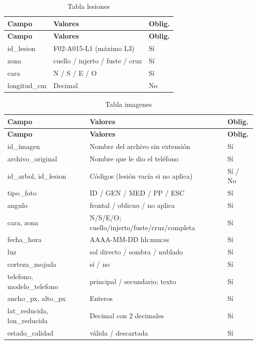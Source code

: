 \documentclass[11pt]{article}
\begin{document}
{\small
\begin{longtable}{|>{\RaggedRight\arraybackslash}p{4.81cm}|>{\RaggedRight\arraybackslash}p{8.27cm}|>{\RaggedRight\arraybackslash}p{1.54cm}|}
\caption{Tabla lesiones}\\
\hline
\rowcolor{encabezado}\textbf{Campo} & \textbf{Valores} & \textbf{Oblig.} \\ \hline
\endfirsthead
\hline
\rowcolor{encabezado}\textbf{Campo} & \textbf{Valores} & \textbf{Oblig.} \\ \hline
\endhead
id\_lesion & F02-A015-L1 (máximo L3) & Sí \\ \hline
zona & cuello / injerto / fuste / cruz & Sí \\ \hline
cara & N / S / E / O & Sí \\ \hline
longitud\_cm & Decimal & No \\ \hline
\end{longtable}}
{\small
\begin{longtable}{|>{\RaggedRight\arraybackslash}p{4.81cm}|>{\RaggedRight\arraybackslash}p{8.27cm}|>{\RaggedRight\arraybackslash}p{1.54cm}|}
\caption{Tabla imagenes}\\
\hline
\rowcolor{encabezado}\textbf{Campo} & \textbf{Valores} & \textbf{Oblig.} \\ \hline
\endfirsthead
\hline
\rowcolor{encabezado}\textbf{Campo} & \textbf{Valores} & \textbf{Oblig.} \\ \hline
\endhead
id\_imagen & Nombre del archivo sin extensión & Sí \\ \hline
archivo\_original & Nombre que le dio el teléfono & Sí \\ \hline
id\_arbol, id\_lesion & Códigos (lesión vacía si no aplica) & Sí / No \\ \hline
tipo\_foto & ID / GEN / MED / PP / ESC & Sí \\ \hline
angulo & frontal / oblicuo / no aplica & Sí \\ \hline
cara, zona & N/S/E/O; cuello/injerto/fuste/cruz/completa & Sí \\ \hline
fecha\_hora & AAAA-MM-DD hh:mm:ss & Sí \\ \hline
luz & sol directo / sombra / nublado & Sí \\ \hline
corteza\_mojada & sí / no & Sí \\ \hline
telefono, modelo\_telefono & principal / secundario; texto & Sí \\ \hline
ancho\_px, alto\_px & Enteros & Sí \\ \hline
lat\_reducida, lon\_reducida & Decimal con 2 decimales & Sí \\ \hline
estado\_calidad & válida / descartada & Sí \\ \hline
\end{longtable}}
\end{document}
